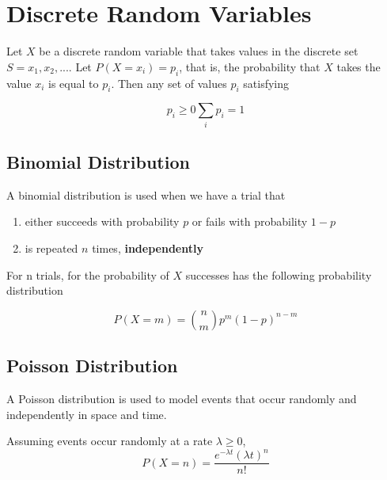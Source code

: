 \section{Discrete Random Variables} %
\label{sec:discrete_random_variables}

Let $X$ be a discrete random variable that takes values in the discrete set $S = {x_1, x_2, ...}$. Let $P(X = x_i) = p_i$, that is, the probability that $X$ takes the value $x_i$ is equal to $p_i$. Then any set of values $p_i$ satisfying

\begin{subequations}
  \begin{equation}
    p_i \geq 0
  \end{equation}
  \begin{equation}
    \sum_{i}p_i = 1
  \end{equation}
\end{subequations}

\subsection{Binomial Distribution} %
\label{sub:binomial_distribution}

A binomial distribution is used when we have a trial that
\begin{enumerate}
  \item either  succeeds with probability $p$ or fails with probability $1-p$
  \item is repeated $n$ times, \textbf{independently}
\end{enumerate}

For n trials, for the probability of $X$ successes has the following probability distribution

\begin{equation}
  P(X=m) = \binom{n}{m}p^m(1-p)^{n-m}
\end{equation}

\subsection{Poisson Distribution} %
\label{sub:poisson_distribution}

A Poisson distribution is used to model events that occur randomly and independently in space and time.

Assuming events occur randomly at a rate $\lambda \geq 0$,
\begin{equation}
  P(X=n)=\frac{e^{- \lambda t}(\lambda t)^n}{n!}
\end{equation}
